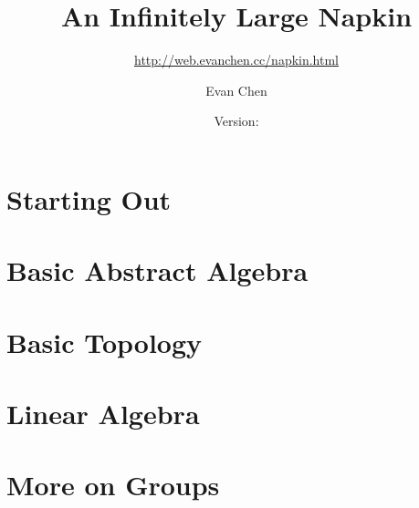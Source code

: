 \documentclass[11pt,twoside=semi,openright,numbers=noenddot]{scrbook}
\title{An Infinitely Large Napkin}
\subtitle{\url{http://web.evanchen.cc/napkin.html}}
\author{Evan Chen}
\date{Version: \napkinversion}
\begin{document}
\frontmatter
\maketitle




\setcounter{chapter}{-1} %


\cleardoublepage
{}
\setcounter{temppage}{\value{page}}
\mainmatter
\setcounter{page}{\value{temppage}}

\tableofcontents


\part{Starting Out}
\label{part:startout}
\parttoc
\setcounter{chapter}{-1} %




\part{Basic Abstract Algebra}
\label{part:absalg}
\parttoc




\part{Basic Topology}
\label{part:basictop}
\parttoc




\part{Linear Algebra}
\label{part:linalg}
\parttoc








\part{More on Groups}
\label{part:groups}
\parttoc



\end{document}
